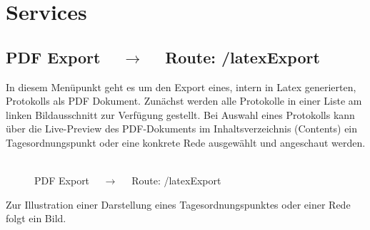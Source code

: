 \documentclass[10pt]{report}
\begin{document}
    
\chapter{Services}

       
\section{PDF Export  $\quad\rightarrow\quad$  Route:  /latexExport}

In diesem Menüpunkt geht es um den Export eines, intern in Latex generierten, Protokolls als PDF Dokument. Zunächst werden alle Protokolle in einer Liste am linken Bildausschnitt zur Verfügung gestellt. 
Bei Auswahl eines Protokolls kann über die Live-Preview des PDF-Dokuments im Inhaltsverzeichnis (Contents) ein Tagesordnungspunkt oder eine konkrete Rede ausgewählt und angeschaut werden. \\\\


\begin{figure}[H]
	\begin{center}		
  	 \end{center}
	\caption{PDF Export  $\quad\rightarrow\quad$  Route:  /latexExport}	
 \end{figure}

\noindent Zur Illustration einer Darstellung eines Tagesordnungspunktes oder einer Rede folgt ein Bild.
\end{document}
